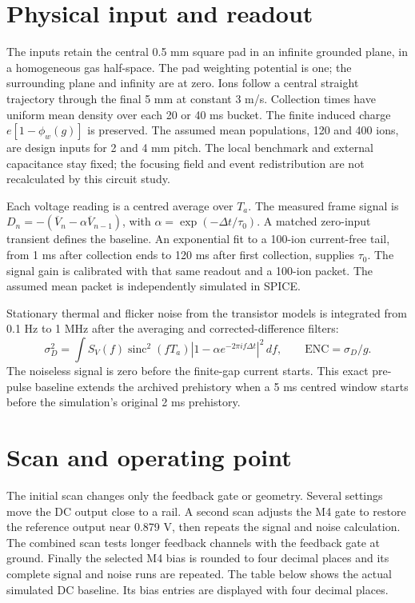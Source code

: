 \documentclass[11pt,a4paper]{article}
\begin{document}
\section{Physical input and readout}
The inputs retain the central 0.5 mm square pad in an infinite grounded plane,
in a homogeneous gas half-space. The pad weighting potential is one; the
surrounding plane and infinity are at zero. Ions follow a central straight
trajectory through the final 5 mm at constant 3 m/s. Collection times have
uniform mean density over each 20 or 40 ms bucket. The finite induced charge
$e[1-\phi_w(g)]$ is preserved. The assumed mean populations, 120 and 400 ions,
are design inputs for 2 and 4 mm pitch. The local benchmark and external
capacitance stay fixed; the focusing field and event redistribution are not
recalculated by this circuit study.

Each voltage reading is a centred average over $T_a$. The measured frame
signal is $D_n=-(\overline V_n-\alpha\overline V_{n-1})$, with
$\alpha=\exp(-\Delta t/\tau_0)$. A matched zero-input transient defines the
baseline. An exponential fit to a 100-ion current-free tail, from 1 ms after
collection ends to 120 ms after first collection, supplies $\tau_0$.
The signal gain is calibrated with that same readout and a 100-ion packet.
The assumed mean packet is independently simulated in SPICE.

Stationary thermal and flicker noise from the transistor models is integrated
from 0.1 Hz to 1 MHz after the averaging and corrected-difference filters:
\[
 \sigma_D^2=\int S_V(f)\operatorname{sinc}^2(fT_a)
 |1-\alpha e^{-2\pi i f\Delta t}|^2\,df,\qquad
 \mathrm{ENC}=\sigma_D/g.
\]
The noiseless signal is zero before the finite-gap current starts. This exact
pre-pulse baseline extends the archived prehistory when a 5 ms centred window
starts before the simulation's original 2 ms prehistory.

\section{Scan and operating point}
The initial scan changes only the feedback gate or geometry. Several settings
move the DC output close to a rail. A second scan adjusts the M4 gate to restore
the reference output near 0.879 V, then repeats the signal and noise calculation.
The combined scan tests longer feedback channels with the feedback gate at ground.
Finally the selected M4 bias is rounded to four decimal places and its complete
signal and noise runs are repeated. The table below shows the actual simulated
DC baseline. Its bias entries are displayed with four decimal places.
\end{document}
